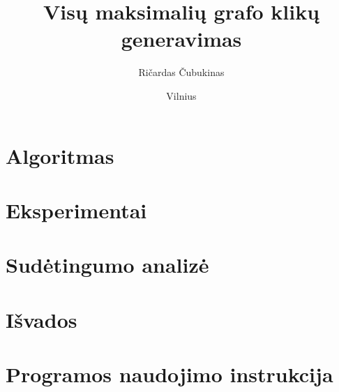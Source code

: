 \documentclass{VUMIFInfKursinis}
\institute{Informatikos institutas}
\title{Visų maksimalių grafo klikų generavimas}
\author{Ričardas Čubukinas}
\date{Vilnius \\ \the\year}
\begin{document}
\maketitle

\tableofcontents


\section{Algoritmas}

\section{Eksperimentai}

\section{Sudėtingumo analizė}

\section{Išvados}

\section{Programos naudojimo instrukcija}

\printbibliography[heading=bibintoc] %

\end{document}
